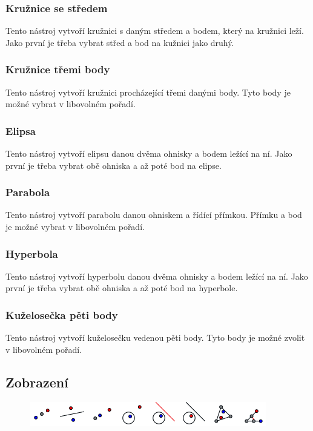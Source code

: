 \documentclass[11pt]{article}
\begin{document}
    \subsubsection{Kružnice se středem}
    Tento nástroj vytvoří kružnici s daným středem a bodem, který na kružnici leží. Jako první je třeba vybrat střed a bod na kužnici jako druhý.
    \subsubsection{Kružnice třemi body}
    Tento nástroj vytvoří kružnici procházející třemi danými body. Tyto body je možné vybrat v libovolném pořadí.
    \subsubsection{Elipsa}
    Tento nástroj vytvoří elipsu danou dvěma ohnisky a bodem ležící na ní. Jako první je třeba vybrat obě ohniska a až poté bod na elipse.
    \subsubsection{Parabola}
    Tento nástroj vytvoří parabolu danou ohniskem a řídící přímkou. Přímku a bod je možné vybrat v libovolném pořadí.
    \subsubsection{Hyperbola}
    Tento nástroj vytvoří hyperbolu danou dvěma ohnisky a bodem ležící na ní. Jako první je třeba vybrat obě ohniska a až poté bod na hyperbole.
    \subsubsection{Kuželosečka pěti body}
    Tento nástroj vytvoří kuželosečku vedenou pěti body. Tyto body je možné zvolit v libovolném pořadí.

    \subsection{Zobrazení}
    \vspace{-10pt}
    \begin{figure}[h]
        \begin{center}
        \includegraphics[scale=0.5]{imgs/transform_tools.png}
        \end{center}
    \end{figure}
    \vspace{-25pt}
\end{document}
